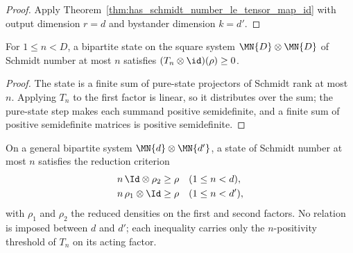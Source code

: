 \begin{proof}
    \leanok
    Apply Theorem~\ref{thm:has_schmidt_number_le_tensor_map_id} with output dimension
    $r=d$ and bystander dimension $k=d'$.
\end{proof}

\begin{theorem}
    \label{thm:has_schmidt_number_le_tensor_map_id_t_eta}
    \leanok
    For $1\le n<D$, a bipartite state on the square system
    $\MN{D}\otimes\MN{D}$ of Schmidt number at most $n$ satisfies
    $(T_n\otimes\id)(\rho)\ge 0$.
\end{theorem}

\begin{proof}
    \leanok
    The state is a finite sum of pure-state projectors of Schmidt rank at most $n$.
    Applying $T_n$ to the first factor is linear, so it distributes over the sum; the
    pure-state step makes each summand positive semidefinite, and a finite sum of
    positive semidefinite matrices is positive semidefinite.
\end{proof}

\begin{theorem}
    \label{thm:reduction_criterion_of_schmidt_number}
    \leanok
    On a general bipartite system $\MN{d}\otimes\MN{d'}$, a state of Schmidt number at
    most $n$ satisfies the reduction criterion
    \begin{align}
        n\,\Id\otimes\rho_2 & \ge\rho
                            &         & (1\le n<d),
        \notag                                       \\
        n\,\rho_1\otimes\Id & \ge\rho
                            &         & (1\le n<d'),
        \notag
    \end{align}
    with $\rho_1$ and $\rho_2$ the reduced densities on the first and second factors.
    No relation is imposed between $d$ and $d'$; each inequality carries only the
    $n$-positivity threshold of $T_n$ on its acting factor.
\end{theorem}

